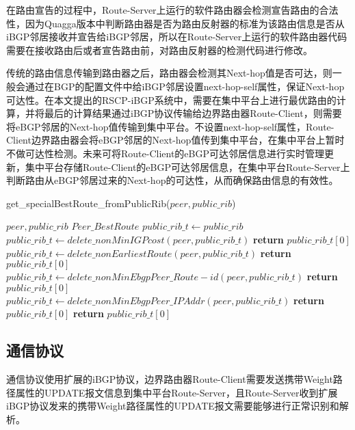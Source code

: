 在路由宣告的过程中，Route-Server上运行的软件路由器会检测宣告路由的合法性，因为Quagga版本中判断路由器是否为路由反射器的标准为该路由信息是否从iBGP邻居接收并宣告给iBGP邻居，所以在Route-Server上运行的软件路由器代码需要在接收路由后或者宣告路由前，对路由反射器的检测代码进行修改。

传统的路由信息传输到路由器之后，路由器会检测其Next-hop值是否可达，则一般会通过在BGP的配置文件中给iBGP邻居设置next-hop-self属性，保证Next-hop可达性。在本文提出的RSCP-iBGP系统中，需要在集中平台上进行最优路由的计算，并将最后的计算结果通过iBGP协议传输给边界路由器Route-Client，则需要将eBGP邻居的Next-hop值传输到集中平台。不设置next-hop-self属性，Route-Client边界路由器会将eBGP邻居的Next-hop值传到集中平台，在集中平台上暂时不做可达性检测。未来可将Route-Client的eBGP可达邻居信息进行实时管理更新，集中平台存储Route-Client的eBGP可达邻居信息，在集中平台Route-Server上判断路由从eBGP邻居过来的Next-hop的可达性，从而确保路由信息的有效性。

\begin{algorithm}[!h]
    \caption{get\_specialBestRoute\_fromPublicRib($peer,public\_rib$)}
    \label{alg:public selection_two}
    \begin{algorithmic}[1]%
         \REQUIRE
        $peer,public\_rib$
        \ENSURE
        $Peer\_BestRoute$
        \STATE $public\_rib\_t \gets public\_rib$
        \STATE $public\_rib\_t \gets delete\_nonMinIGPcost(peer, public\_rib\_t)$
        \STATE \textbf{return} $public\_rib\_t[0]$
        \ENDIF
        \STATE $public\_rib\_t \gets delete\_nonEarliestRoute(peer, public\_rib\_t)$
        \STATE \textbf{return} $public\_rib\_t[0]$
        \ENDIF
        \STATE $public\_rib\_t \gets delete\_nonMinEbgpPeer\_Route-id(peer, public\_rib\_t)$
        \STATE \textbf{return} $public\_rib\_t[0]$
        \ENDIF
        \STATE $public\_rib\_t \gets delete\_nonMinEbgpPeer\_IPAddr(peer, public\_rib\_t)$
        \STATE \textbf{return} $public\_rib\_t[0]$
        \ENDIF
        \STATE \textbf{return} $public\_rib\_t[0]$
    \end{algorithmic}
\end{algorithm}


\subsection{通信协议}
通信协议使用扩展的iBGP协议，边界路由器Route-Client需要发送携带Weight路径属性的UPDATE报文信息到集中平台Route-Server，且Route-Server收到扩展iBGP协议发来的携带Weight路径属性的UPDATE报文需要能够进行正常识别和解析。

